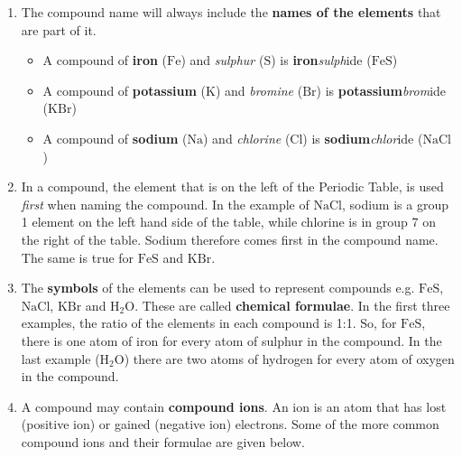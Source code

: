       \label{m38708*id64037}\begin{enumerate}[noitemsep, label=\textbf{\arabic*}. ] 
            \label{m38708*uid35}\item The compound name will always include the \textbf{names of the elements} that are part of it.
\label{m38708*id64059}\begin{itemize}[noitemsep]
            \label{m38708*uid36}\item A compound of \textbf{iron} ($\mathrm{Fe}$) and \textsl{sulphur} ($\mathrm{S}$) is \textbf{iron}\hspace{1ex}\textsl{sulph}ide ($\mathrm{FeS}$)
\label{m38708*uid37}\item A compound of \textbf{potassium} ($\mathrm{K}$) and \textsl{bromine} ($\mathrm{Br}$) is \textbf{potassium}\hspace{1ex}\textsl{brom}ide ($\mathrm{KBr}$)
\label{m38708*uid38}\item A compound of \textbf{sodium} ($\mathrm{Na}$) and \textsl{chlorine} ($\mathrm{Cl}$) is \textbf{sodium}\hspace{1ex}\textsl{chlor}ide ($\mathrm{NaCl}$)
\end{itemize}
        \label{m38708*uid39}\item In a compound, the element that is on the left of the Periodic Table, is used \textsl{first} when naming the compound. In the example of $\mathrm{NaCl}$, sodium is a group 1 element on the left hand side of the table, while chlorine is in group 7 on the right of the table. Sodium therefore comes first in the compound name. The same is true for $\mathrm{FeS}$ and $\mathrm{KBr}$.
\label{m38708*uid40}\item The \textbf{symbols} of the elements can be used to represent compounds e.g. $\mathrm{FeS}$, $\mathrm{NaCl}$, $\mathrm{KBr}$ and $\mathrm{H}{}_{2}\mathrm{O}$. These are called \textbf{chemical formulae}. In the first three examples, the ratio of the elements in each compound is 1:1. So, for $\mathrm{FeS}$, there is one atom of iron for every atom of sulphur in the compound. In the last example ($\mathrm{H}{}_{2}\mathrm{O}$) there are two atoms of hydrogen for every atom of oxygen in the compound.
\label{m38708*uid41}\item A compound may contain \textbf{compound ions}. An ion is an atom that has lost (positive ion) or gained (negative ion) electrons. Some of the more common compound ions and their formulae are given below.
          \begin{table}[H]

\end{table}
\end{enumerate}
